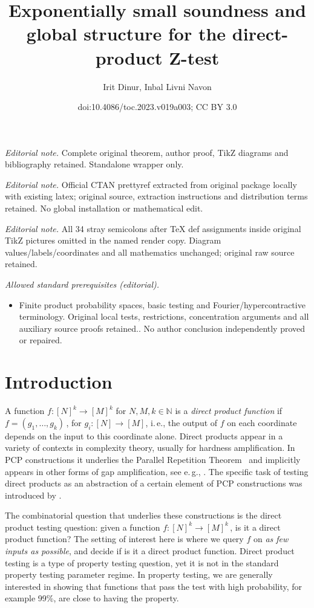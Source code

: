 \documentclass[11pt]{article}
\title{Exponentially small soundness and global structure for the direct-product Z-test}
\author{Irit Dinur, Inbal Livni Navon}
\date{doi:10.4086/toc.2023.v019a003; CC BY 3.0}
\numberwithin{equation}{section}
\theoremstyle{definition}
\theoremstyle{plain}
\newcommand{\ie}{i.\,e.}
\newcommand{\eg}{e.\,g.}
\newcommand\f{f} %
\newcommand\pf{g} %
\begin{document}
\maketitle
\noindent\textit{Editorial note.} Complete original theorem, author proof, TikZ diagrams and bibliography retained. Standalone wrapper only.\par\medskip
\noindent\textit{Editorial note.} Official CTAN prettyref extracted from original package locally with existing latex; original source, extraction instructions and distribution terms retained. No global installation or mathematical edit.\par\medskip
\noindent\textit{Editorial note.} All 34 stray semicolons after TeX def assignments inside original TikZ pictures omitted in the named render copy. Diagram values/labels/coordinates and all mathematics unchanged; original raw source retained.\par\medskip
\noindent\textit{Allowed standard prerequisites (editorial).}\begin{itemize}
\item Finite product probability spaces, basic testing and Fourier/hypercontractive terminology. Original local tests, restrictions, concentration arguments and all auxiliary source proofs retained.. No author conclusion independently proved or repaired.
\end{itemize}\medskip
\section{Introduction}
%
A function $\f:[N]^k\rightarrow[M]^k$ for $N,M,k\in\mathbb{N}$
%
is a \emph{direct product function} if $\f=(\pf_1,\ldots, \pf_k)$\,, for $\pf_i:[N]\rightarrow[M]$, \ie, the output of $\f$ on each coordinate depends on the input to this coordinate alone.
%
%
Direct products appear in a variety of contexts in 
%
complexity theory,  %
usually for hardness amplification. In %
PCP constructions  %
it underlies the Parallel Repetition Theorem~%
%
\cite{raz1998parallel} and implicitly appears in other forms of gap amplification, see %
\eg, \cite{dinur2007pcp}. The specific task of testing direct products as an abstraction of a certain element of PCP constructions was introduced by \cite{goldreich2000combinatorial}.

%
The combinatorial question that underlies these %
%
constructions %
is the direct product testing question: given a function $\f:[N]^k\rightarrow[M]^k$\,, is it a direct product function? The setting of interest here is where we query $\f$ %
on  %
\emph{as few inputs as possible}, and decide 
if is it a direct product function. %
%
%
Direct product testing  %
is a type of property testing question, yet it is not in the standard property testing parameter regime. In property testing, we are generally interested in showing that functions that pass the test with high probability, for example 99\%, are close to having the property.
\end{document}
